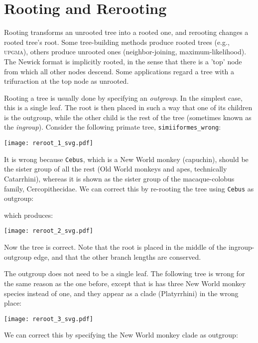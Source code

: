 
\section{Rooting and Rerooting}
\label{sct_reroot}

Rooting transforms an unrooted tree into a rooted one, and rerooting changes a
rooted tree's root. Some tree-building methods produce rooted trees (e.g.,
\textsc{upgma}), others produce unrooted ones (neighbor-joining,
maximum-likelihood).  The Newick format is implicitly rooted, in the sense that
there is a 'top' node from which all other nodes descend. Some applications
regard a tree with a trifuraction at the top node as unrooted. 

Rooting a tree is usually done by specifying an \textit{outgroup}. In the
simplest case, this is a single leaf. The root is then placed in such a way
that one of its children is the outgroup, while the other child is the rest of
the tree (sometimes known as the \textit{ingroup}). Consider the following
primate tree, \texttt{simiiformes\_wrong}:

\begin{center}
\texttt{[image: reroot\_1\_svg.pdf]}
\end{center}

\noindent{}It is wrong because \texttt{Cebus}, which is a New World monkey (capuchin), should be the sister group of all the rest (Old World monkeys and apes, technically Catarrhini), whereas it is shown as the sister group of the macaque-colobus family, Cercopithecidae. We can correct this by re-rooting the tree using \texttt{Cebus} as outgroup:

which produces:

\begin{center}
\texttt{[image: reroot\_2\_svg.pdf]}
\end{center}

\noindent{}Now the tree is correct. Note that the root is placed in the middle of the ingroup-outgroup edge, and that the other branch lengths are conserved.

The outgroup does not need to be a single leaf. The following tree is
wrong for the same reason as the one before, except that is has three New World
monkey species instead of one, and they appear as a clade (Platyrrhini) in the
wrong place:

\begin{center}
\texttt{[image: reroot\_3\_svg.pdf]}
\end{center}

\noindent{}We can correct this by specifying the New World monkey clade as outgroup:

